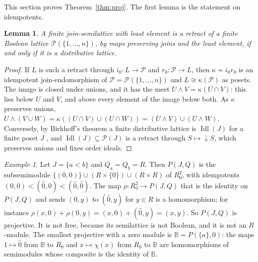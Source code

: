 \documentclass[11pt]{amsart}
\newtheorem{lemma}[thm]{Lemma}
\theoremstyle{remark}
\newtheorem{example}[thm]{Example}
\newcommand{\B}{\mathbb B}
\newcommand{\oz}{\widehat{0}}
\DeclareMathOperator{\Idl}{Idl}
\begin{document}
This section proves Theorem~\ref{thm:proj}. The first lemma is the statement on idempotents.

\begin{lemma}\label{lem:retract}
A finite join-semilattice with least element is a retract of a finite Boolean lattice $\mathcal P(\{1,\dots,n\})$, by maps preserving joins and the least element, if and only if it is a distributive lattice.
\end{lemma}

\begin{proof}
If $L$ is such a retract through $i_0\colon L\to\mathcal P$ and $r_0\colon\mathcal P\to L$, then $\kappa=i_0r_0$ is an idempotent join-endomorphism of $\mathcal P=\mathcal P(\{1,\dots,n\})$ and $L\cong\kappa(\mathcal P)$ as posets. The image is closed under unions, and it has the meet $U\wedge V=\kappa(U\cap V)$: this lies below $U$ and $V$, and above every element of the image below both. As $\kappa$ preserves unions, $U\wedge(V\cup W)=\kappa((U\cap V)\cup(U\cap W))=(U\wedge V)\cup(U\wedge W)$. Conversely, by Birkhoff's theorem a finite distributive lattice is $\Idl(J)$ for a finite poset $J$ \cite{Birkhoff}, and $\Idl(J)\subseteq\mathcal P(J)$ is a retract through $S\mapsto{\downarrow}S$, which preserves unions and fixes order ideals.
\end{proof}

\begin{example}\label{ex:chain}
Let $J=\{a<b\}$ and $Q_a=Q_b=R$. Then $P(J,Q)$ is the subsemimodule $\{(0,0)\}\cup(R\times\{0\})\cup(R\times R)$ of $R_0^2$, with idempotents $(0,0)<(\oz,0)<(\oz,\oz)$. The map $\rho\colon R_0^2\to P(J,Q)$ that is the identity on $P(J,Q)$ and sends $(0,y)$ to $(\oz,y)$ for $y\in R$ is a homomorphism; for instance $\rho(x,0)+\rho(0,y)=(x,0)+(\oz,y)=(x,y)$. So $P(J,Q)$ is projective. It is not free, because its semilattice is not Boolean, and it is not an $R$-module. The smallest projective with a zero module is $\B=P(\{a\},0)$: the maps $1\mapsto\oz$ from $\B$ to $R_0$ and $x\mapsto\chi(x)$ from $R_0$ to $\B$ are homomorphisms of semimodules whose composite is the identity of $\B$.
\end{example}
\end{document}
